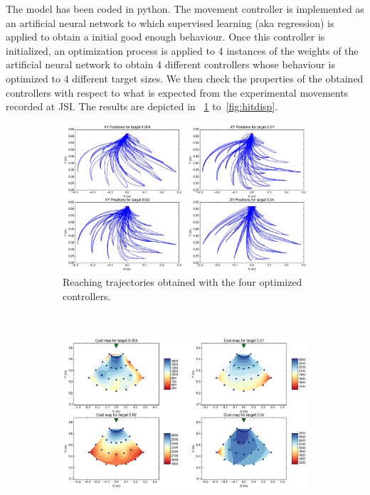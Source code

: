 The model has been coded in python. The movement controller is implemented as an artificial neural network to which supervised learning (aka regression) is applied to obtain a initial good enough behaviour. Once this controller is initialized, an optimization process is applied to 4 instances of the weights of the artificial neural network to obtain 4 different controllers whose behaviour is optimized to 4 different target sizes. We then check the properties of the obtained controllers with respect to what is expected from the experimental movements recorded at JSI. The results are depicted in \figurename~\ref{fig:trajs} to~\ref{fig:hitdisp}.

\begin{figure}[t!]
 \centering
  \begin{subfigure}[t]{0.45\textwidth}
    \centering
    \includegraphics[width=0.9\linewidth]{images/trajs.png}
    \caption{Reaching trajectories obtained with the four optimized controllers.\label{fig:trajs}}
  \end{subfigure}%
  ~ 
  \begin{subfigure}[t]{0.45\textwidth}
    \centering
    \includegraphics[width=0.9\linewidth]{images/costmap.png}

\end{subfigure}
\end{figure}

